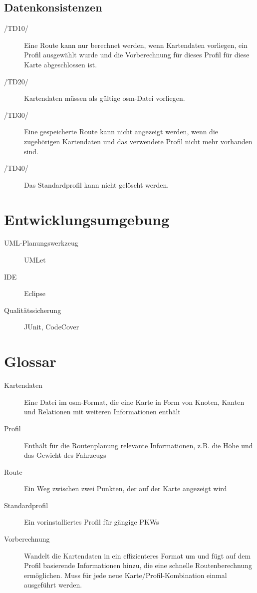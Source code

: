 \documentclass[a4paper, 11pt]{article}
\begin{document}
\subsection{Datenkonsistenzen}
\begin{description}
\item[/TD10/]
Eine Route kann nur berechnet werden, wenn Kartendaten vorliegen, ein Profil ausgewählt wurde und die Vorberechnung für dieses Profil für diese Karte abgeschlossen ist.
\item[/TD20/]
Kartendaten müssen als gültige osm-Datei vorliegen.
\item[/TD30/]
Eine gespeicherte Route kann nicht angezeigt werden, wenn die zugehörigen Kartendaten und das verwendete Profil nicht mehr vorhanden sind.
\item[/TD40/]
Das Standardprofil kann nicht gelöscht werden.
\end{description}
\section{Entwicklungsumgebung}
\begin{description}
  \item[UML-Planungswerkzeug] UMLet
  \item[IDE] Eclipse
  \item[Qualitätssicherung] JUnit, CodeCover
\end{description}
\section{Glossar}
\begin{description}
\item[Kartendaten] Eine Datei im osm-Format, die eine Karte in Form von Knoten, Kanten und Relationen mit weiteren Informationen enthält
\item[Profil]
Enthält für die Routenplanung relevante Informationen, z.B. die Höhe und das Gewicht des Fahrzeugs
\item[Route]
Ein Weg zwischen zwei Punkten, der auf der Karte angezeigt wird
\item[Standardprofil]
Ein vorinstalliertes Profil für gängige PKWs
\item[Vorberechnung] Wandelt die Kartendaten in ein effizienteres Format um und fügt auf dem Profil basierende Informationen hinzu, die eine schnelle Routenberechnung ermöglichen. Muss für jede neue Karte/Profil-Kombination einmal ausgeführt werden.
\end{description}
\end{document}
